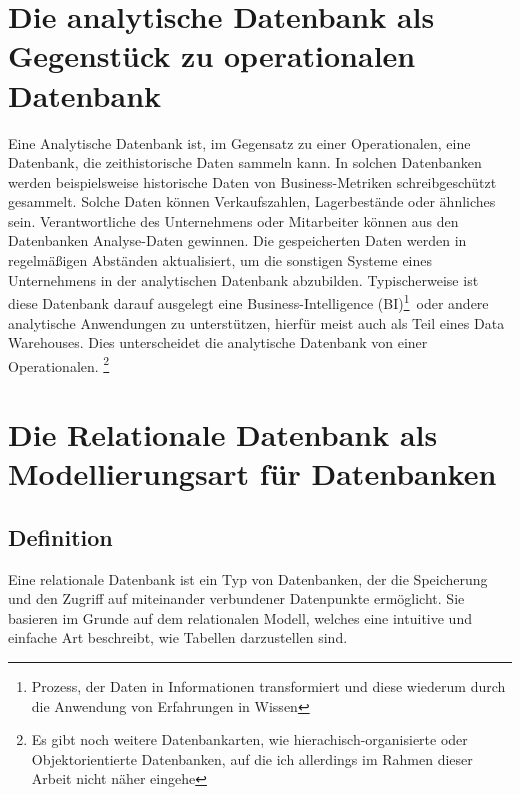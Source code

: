 \section{Die analytische Datenbank als Gegenstück zu operationalen Datenbank}
Eine Analytische Datenbank ist, im Gegensatz zu einer Operationalen, eine Datenbank, die zeithistorische Daten sammeln kann.
In solchen Datenbanken werden beispielsweise historische Daten von Business-Metriken schreibgeschützt gesammelt. 
Solche Daten können Verkaufszahlen, Lagerbestände oder ähnliches sein.
Verantwortliche des Unternehmens oder Mitarbeiter können aus den Datenbanken Analyse-Daten gewinnen.
Die gespeicherten Daten werden in regelmäßigen Abständen aktualisiert, um die sonstigen Systeme eines Unternehmens in der analytischen Datenbank abzubilden.
Typischerweise ist diese Datenbank darauf ausgelegt eine \glqq Business-Intelligence (BI)\grqq\footnote{\glqq Prozess, der Daten in Informationen transformiert und diese wiederum durch die Anwendung von Erfahrungen in Wissen\grqq\cite{BigData:BI}}~oder andere analytische Anwendungen zu unterstützen, hierfür meist auch als Teil eines Data Warehouses.
Dies unterscheidet die analytische Datenbank von einer Operationalen.
\cite{CW:analytische_Datenbank}\footnote{Es gibt noch weitere Datenbankarten, wie hierachisch-organisierte oder Objektorientierte Datenbanken, auf die ich allerdings im Rahmen dieser Arbeit nicht näher eingehe}
\section{Die Relationale Datenbank als Modellierungsart für Datenbanken}
\subsection{Definition}
\glqq Eine relationale Datenbank ist ein Typ von Datenbanken, der die Speicherung und den Zugriff auf miteinander verbundener Datenpunkte ermöglicht.\grqq\cite{Oracle:rel_DB}\newline
Sie basieren im Grunde auf dem relationalen Modell, welches eine intuitive und einfache Art beschreibt, wie Tabellen darzustellen sind.
